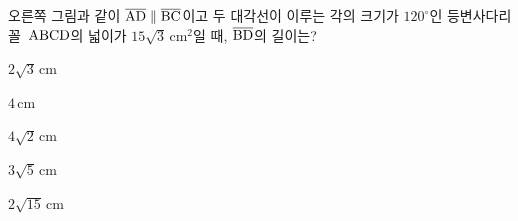 \noindent\begin{minipage}[t]{0.58\linewidth}\vspace{0pt}\raggedright 오른쪽 그림과 같이 $\overline{\mathrm{AD}}\parallel\overline{\mathrm{BC}}$이고 두 대각선이 이루는 각의 크기가 $120^\circ$인 등변사다리꼴~$\mathrm{ABCD}$의 넓이가 $15\sqrt{3}\,\mathrm{cm}^2$일 때, $\overline{\mathrm{BD}}$의 길이는?\end{minipage}\hfill\begin{minipage}[t]{0.4\linewidth}\vspace{0pt}\centering \resizebox{\ifdim\width>\linewidth\linewidth\else\width\fi}{!}{}\end{minipage}\par
\begin{choices32}{\rule[-3ex]{0pt}{8ex}$2\sqrt{3}\,\mathrm{cm}$}{\rule[-3ex]{0pt}{8ex}$4\,\mathrm{cm}$}{\rule[-3ex]{0pt}{8ex}$4\sqrt{2}\,\mathrm{cm}$}{\rule[-3ex]{0pt}{8ex}$3\sqrt{5}\,\mathrm{cm}$}{\rule[-3ex]{0pt}{8ex}$2\sqrt{15}\,\mathrm{cm}$}\end{choices32}
